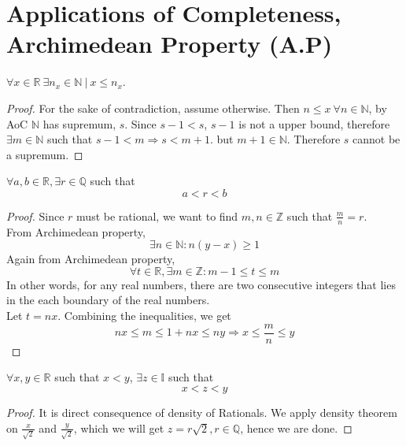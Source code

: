 \section{Applications of Completeness, Archimedean Property (A.P)}
\begin{theorem} $\forall x \in \mathbb{R} \ \exists n_x \in \mathbb{N}\  | \ x \le n_x$.
    \begin{proof}
        For the sake of contradiction, assume otherwise. Then $n \le x\ \forall n \in \mathbb{N}$, by AoC $\mathbb{N}$ has supremum, $s$. Since $s-1 < s$, $s-1$ is not a upper bound, therefore $\exists m \in \mathbb{N}$ such that $s-1 < m \Rightarrow s < m+1$. but $m+1 \in \mathbb{N}$. Therefore $s$ cannot be a supremum.
    \end{proof}
\end{theorem}
\begin{theorem} $\forall a,b \in \mathbb{R}, \exists r \in \mathbb{Q}$ such that 
    \[ a < r < b\]
    \begin{proof} Since $r$ must be rational, we want to find $ m,n \in \mathbb{Z}$ such that $\frac{m}{n} = r$.\\
    From Archimedean property,
    \[\exists n \in \mathbb{N}: n(y-x) \ge 1\]
    Again from Archimedean property,
    \[\forall t \in \mathbb{R}, \exists m \in \mathbb{Z}: m-1 \le t \le m\]
    In other words, for any real numbers, there are two consecutive integers that lies in the each boundary of the real numbers.\\
    Let $t= nx$. Combining the inequalities, we get
    \[nx \le m \le 1+ nx \le ny \Rightarrow x \le \frac{m}{n} \le y \]
    \end{proof}
\end{theorem}
\begin{theorem} $\forall x,y \in \mathbb{R}$ such that $x < y$, $\exists z \in \mathbb{I}$ such that 
    \[ x < z <y\]
    \begin{proof} It is direct consequence of density of Rationals. We apply density theorem on $\frac{x}{\sqrt{2}}$ and $\frac{y}{\sqrt{2}}$, which we will get $z = r\sqrt{2}, r \in \mathbb{Q}$, hence we are done.
    \end{proof}
\end{theorem}
